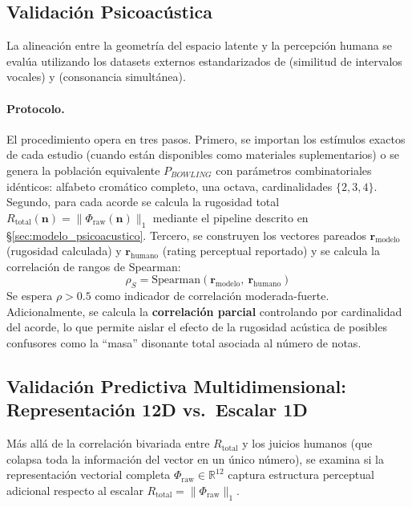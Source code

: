 \subsection{Validación Psicoacústica}
La alineación entre la geometría del espacio latente y la percepción humana se evalúa utilizando los datasets externos estandarizados de  (similitud de intervalos vocales) y  (consonancia simultánea).

\paragraph{Protocolo.}
El procedimiento opera en tres pasos. Primero, se importan los estímulos exactos de cada estudio (cuando están disponibles como materiales suplementarios) o se genera la población equivalente $P_{BOWLING}$ con parámetros combinatoriales idénticos: alfabeto cromático completo, una octava, cardinalidades $\{2, 3, 4\}$. Segundo, para cada acorde se calcula la rugosidad total $R_{\text{total}}(\mathbf{n}) = \|\Phi_{\text{raw}}(\mathbf{n})\|_1$ mediante el pipeline descrito en §\ref{sec:modelo_psicoacustico}. Tercero, se construyen los vectores pareados $\mathbf{r}_{\text{modelo}}$ (rugosidad calculada) y $\mathbf{r}_{\text{humano}}$ (rating perceptual reportado) y se calcula la correlación de rangos de Spearman:
\begin{equation}
\rho_S = \text{Spearman}(\mathbf{r}_{\text{modelo}},\ \mathbf{r}_{\text{humano}})
\end{equation}
Se espera $\rho > 0.5$ como indicador de correlación moderada-fuerte. Adicionalmente, se calcula la \textbf{correlación parcial} controlando por cardinalidad del acorde, lo que permite aislar el efecto de la rugosidad acústica de posibles confusores como la ``masa'' disonante total asociada al número de notas.

\subsection{Validación Predictiva Multidimensional: Representación 12D vs.\ Escalar 1D}
\label{subsec:validacion_12d}

Más allá de la correlación bivariada entre $R_{\text{total}}$ y los juicios humanos (que colapsa toda la información del vector en un único número), se examina si la representación vectorial completa $\Phi_{\text{raw}} \in \mathbb{R}^{12}$ captura estructura perceptual adicional respecto al escalar $R_{\text{total}} = \|\Phi_{\text{raw}}\|_1$.

